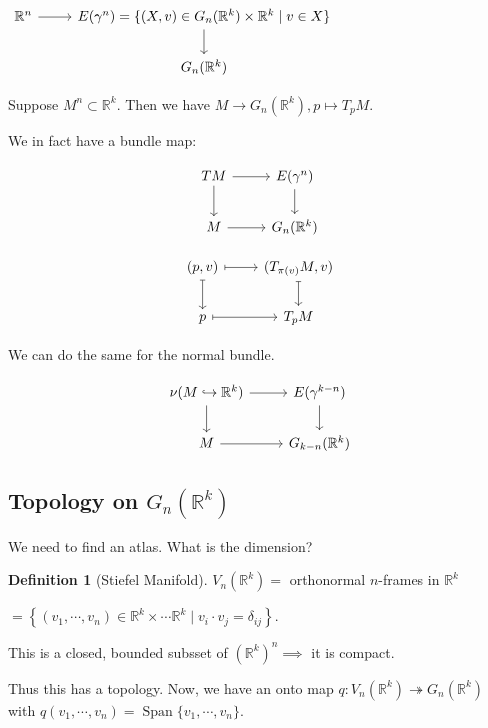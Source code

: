 \documentclass{article}
\theoremstyle{definition}
\newtheorem*{definition}{Definition}
\begin{document}
    \(\begin{tikzcd} \mathbb{R}^n \ar[r] & E(\gamma^n) = \{ (X,v) \in G_n(\mathbb{R}^k) \times \mathbb{R}^k \mid v\in X \} \ar[d] \\ & G_n(\mathbb{R}^k) \end{tikzcd}\) 

    Suppose \(M^n \subset \mathbb{R}^k\). Then we have \(M \to G_n(\mathbb{R}^k), p \mapsto T_p M\).

    We in fact have a bundle map:

    \[
        \begin{tikzcd}
            TM \ar[d] \ar[r] & E(\gamma^n) \ar[d] \\ M \ar[r] & G_n(\mathbb{R}^k)
        \end{tikzcd}
    \]

    \[
        \begin{tikzcd}
            (p,v) \ar[r,mapsto] \ar[d,mapsto] & (T_{\pi(v)}M, v) \ar[d,mapsto] \\ p \ar[r, mapsto] & T_p M
        \end{tikzcd}
    \]

    We can do the same for the normal bundle.

    \[
        \begin{tikzcd}
            \nu(M \hookrightarrow \mathbb{R}^k) \ar[r] \ar[d] & E(\gamma^{k-n}) \ar[d] \\ M \ar[r] & G_{k-n}(\mathbb{R}^k)
        \end{tikzcd}
    \]

    \subsection*{Topology on \(G_n(\mathbb{R}^k)\)}

    We need to find an atlas. What is the dimension?

    \begin{definition}
        [Stiefel Manifold] \(V_n(\mathbb{R}^k) =\) orthonormal \(n\)-frames in \(\mathbb{R}^k\)

        \(= \left\{ (v_1, \cdots , v_n) \in \mathbb{R}^k \times \cdots \mathbb{R}^k \mid v_i \cdot v_j = \delta_{ij} \right\} \).

        This is a closed, bounded subsset of \((\mathbb{R}^k)^n \implies\) it is compact.
    \end{definition}

    Thus this has a topology. Now, we have an onto map \(q:V_n(\mathbb{R}^k) \twoheadrightarrow G_n(\mathbb{R}^k)\) with \(q(v_1, \cdots , v_n) = \operatorname{Span}\{ v_1, \cdots , v_n \}\).
\end{document}
